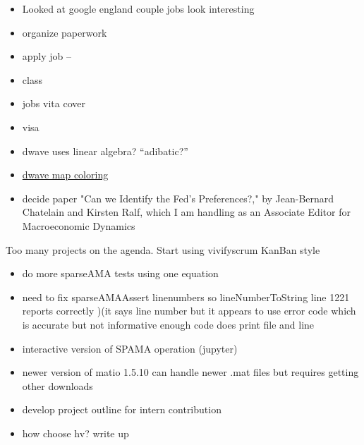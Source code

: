 \documentclass[hyperref]{labbook}
\begin{document}
\begin{itemize}
\item Looked at google england couple jobs look interesting
\item organize paperwork
\item apply job  -- 
\end{itemize}

\begin{itemize}
\item class
\item jobs vita  cover
\item visa
\item dwave uses linear algebra?  ``adibatic?''
\item \href{https://www.dwavesys.com/sites/default/files/Map%20Coloring%20WP2.pdf}{dwave map coloring}
\end{itemize}

\begin{itemize}
\item decide paper "Can we Identify the Fed's Preferences?," by Jean-Bernard Chatelain and Kirsten Ralf, which I am handling as an Associate Editor for Macroeconomic Dynamics 
\end{itemize}


Too many projects on the agenda. Start using vivifyscrum KanBan style

\begin{itemize}
\item do more sparseAMA tests using one equation
\item need to fix sparseAMAAssert linenumbers so lineNumberToString line 1221 reports correctly  )(it says line number but it appears to use error code which is accurate but not informative enough code does print file and line
\item interactive version of SPAMA operation  (jupyter)
\item newer version of matio 1.5.10 can handle newer .mat files but requires getting other downloads
\end{itemize}


\begin{itemize}
\item develop project outline for intern contribution
\item how choose hv?  write up
\end{itemize}
\end{document}
